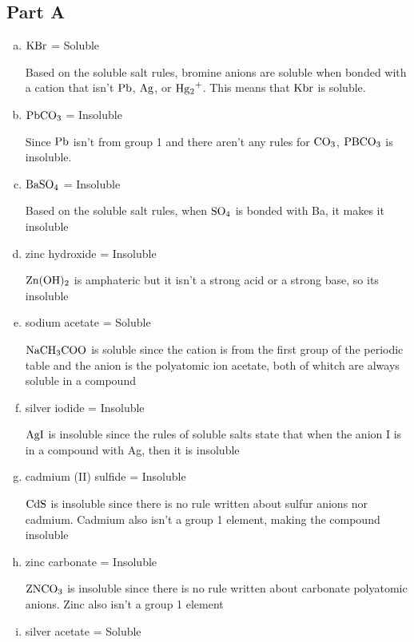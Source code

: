 \documentclass{scrartcl}
\begin{document}
\subsection{Part A}
\label{sec:org6d66165}
\begin{enumerate}[a.]
\item \(\ce{KBr}\) = Soluble

Based on the soluble salt rules, bromine anions are
soluble when bonded with a cation that isn't \(\ce{Pb}\), \(\ce{Ag}\),
or \(\ce{Hg2+}\). This means that \(\ce{Kbr}\) is soluble.

\item \(\ce{PbCO3}\) = Insoluble

Since \(\ce{Pb}\) isn't from group 1 and there
aren't any rules for \(\ce{CO3}\), \(\ce{PBCO3}\) is insoluble.

\item \(\ce{BaSO4}\) = Insoluble

Based on the soluble salt rules, when
\(\ce{SO4}\) is bonded with Ba, it makes it insoluble

\item zinc hydroxide = Insoluble

\(\ce{Zn(OH)2}\) is amphateric but it isn't a
strong acid or a strong base, so its insoluble

\item sodium acetate = Soluble

\(\ce{NaCH3COO}\) is soluble since the cation is
from the first group of the periodic table and the anion is the polyatomic
ion acetate, both of whitch are always soluble in a compound

\item silver iodide = Insoluble

\(\ce{AgI}\) is insoluble since the rules of
soluble salts state that when the anion I is in a compound with Ag, then it
is insoluble

\item cadmium (II) sulfide = Insoluble

\(\ce{CdS}\) is insoluble since there is
no rule written about sulfur anions nor cadmium. Cadmium also isn't a group 1
element, making the compound insoluble

\item zinc carbonate = Insoluble

\(\ce{ZNCO3}\) is insoluble since there is no
rule written about carbonate polyatomic anions. Zinc also isn't a group 1
element

\item silver acetate = Soluble


\end{enumerate}
\end{document}
